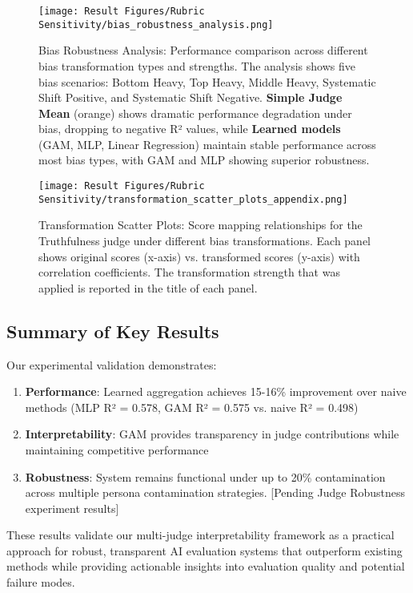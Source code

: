 \begin{figure}[H]
    \centering
    \texttt{[image: Result Figures/Rubric Sensitivity/bias\_robustness\_analysis.png]}
    \caption{Bias Robustness Analysis: Performance comparison across different bias transformation types and strengths. The analysis shows five bias scenarios: Bottom Heavy, Top Heavy, Middle Heavy, Systematic Shift Positive, and Systematic Shift Negative. \textbf{Simple Judge Mean} (orange) shows dramatic performance degradation under bias, dropping to negative R² values, while \textbf{Learned models} (GAM, MLP, Linear Regression) maintain stable performance across most bias types, with GAM and MLP showing superior robustness.}
    \label{fig:bias_robustness}
\end{figure}

\begin{figure}[H]
    \centering
    \texttt{[image: Result Figures/Rubric Sensitivity/transformation\_scatter\_plots\_appendix.png]}
    \caption{Transformation Scatter Plots: Score mapping relationships for the Truthfulness judge under different bias transformations. Each panel shows original scores (x-axis) vs. transformed scores (y-axis) with correlation coefficients. The transformation strength that was applied is reported in the title of each panel.}
    \label{fig:transformation_scatter}
\end{figure}

\subsection{Summary of Key Results}

Our experimental validation demonstrates:

\begin{enumerate}
    \item \textbf{Performance}: Learned aggregation achieves 15-16\% improvement over naive methods (MLP R² = 0.578, GAM R² = 0.575 vs. naive R² = 0.498)
    \item \textbf{Interpretability}: GAM provides transparency in judge contributions while maintaining competitive performance
    \item \textbf{Robustness}: System remains functional under up to 20\% contamination across multiple persona contamination strategies. [Pending Judge Robustness experiment results]
\end{enumerate}

These results validate our multi-judge interpretability framework as a practical approach for robust, transparent AI evaluation systems that outperform existing methods while providing actionable insights into evaluation quality and potential failure modes.
